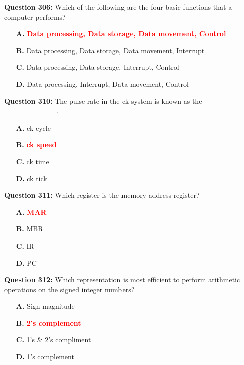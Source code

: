 \documentclass[12pt,a4paper]{article}
\begin{document}
\vspace{0.5cm}

\textbf{Question 306:} Which of the following are the four basic functions that a computer performs?

\begin{itemize}
    \item[\textbf{A.}] \textcolor{red}{\textbf{Data processing, Data storage, Data movement, Control}}
    \item[\textbf{B.}] Data processing, Data storage, Data movement, Interrupt
    \item[\textbf{C.}] Data processing, Data storage, Interrupt, Control
    \item[\textbf{D.}] Data processing, Interrupt, Data movement, Control
\end{itemize}

\vspace{0.5cm}

\textbf{Question 310:} The pulse rate in the ck system is known as the __________.

\begin{itemize}
    \item[\textbf{A.}] ck cycle
    \item[\textbf{B.}] \textcolor{red}{\textbf{ck speed}}
    \item[\textbf{C.}] ck time
    \item[\textbf{D.}] ck tick
\end{itemize}

\vspace{0.5cm}

\textbf{Question 311:} Which register is the memory address register?

\begin{itemize}
    \item[\textbf{A.}] \textcolor{red}{\textbf{MAR}}
    \item[\textbf{B.}] MBR
    \item[\textbf{C.}] IR
    \item[\textbf{D.}] PC
\end{itemize}

\vspace{0.5cm}

\textbf{Question 312:} Which representation is most efficient to perform arithmetic operations on the signed integer numbers?

\begin{itemize}
    \item[\textbf{A.}] Sign-magnitude
    \item[\textbf{B.}] \textcolor{red}{\textbf{2's complement}}
    \item[\textbf{C.}] 1's \& 2's compliment
    \item[\textbf{D.}] 1's complement
\end{itemize}
\end{document}
